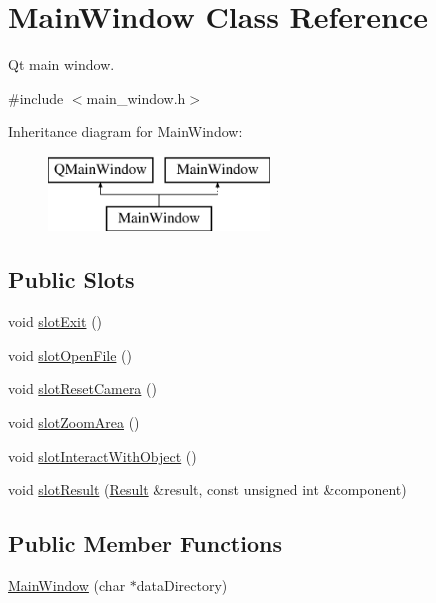 \hypertarget{classMainWindow}{}\section{Main\+Window Class Reference}
\label{classMainWindow}


Qt main window.  




{\ttfamily \#include $<$main\+\_\+window.\+h$>$}

Inheritance diagram for Main\+Window\+:\begin{figure}[H]
\begin{center}
\leavevmode
\includegraphics[height=2.000000cm]{d6/d1a/classMainWindow}
\end{center}
\end{figure}
\subsection*{Public Slots}
\begin{DoxyCompactItemize}
\item 
void \hyperlink{classMainWindow_aca3b7226e638a0cd5ef9d7db749ff67e}{slot\+Exit} ()
\item 
void \hyperlink{classMainWindow_a2ef511727fce3fc9bdf17a73f078cec7}{slot\+Open\+File} ()
\item 
void \hyperlink{classMainWindow_a73d6c706bae3e712ab654a78d1921c89}{slot\+Reset\+Camera} ()
\item 
void \hyperlink{classMainWindow_ab4be74f01161ac57ddf86f32c60137d3}{slot\+Zoom\+Area} ()
\item 
void \hyperlink{classMainWindow_ab2c27d510eabe77a0eb11fc091adc293}{slot\+Interact\+With\+Object} ()
\item 
void \hyperlink{classMainWindow_a914c794d921ccfcd861284bc8cd9f96a}{slot\+Result} (\hyperlink{classResult}{Result} \&result, const unsigned int \&component)
\end{DoxyCompactItemize}
\subsection*{Public Member Functions}
\begin{DoxyCompactItemize}
\item 
\hyperlink{classMainWindow_a06c3eabf20b0ef52c0b33208334e8e1f}{Main\+Window} (char $\ast$data\+Directory)
\end{DoxyCompactItemize}


